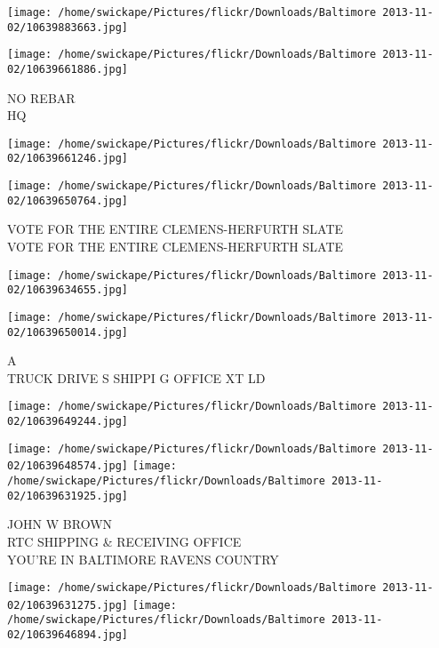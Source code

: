 \documentclass[10pt,letterpaper]{article}
\begin{document}
\texttt{[image: /home/swickape/Pictures/flickr/Downloads/Baltimore 2013-11-02/10639883663.jpg]}

\vspace{0.25in}
\texttt{[image: /home/swickape/Pictures/flickr/Downloads/Baltimore 2013-11-02/10639661886.jpg]}

NO REBAR\\
HQ\\
\pagebreak

\texttt{[image: /home/swickape/Pictures/flickr/Downloads/Baltimore 2013-11-02/10639661246.jpg]}

\vspace{0.25in}
\texttt{[image: /home/swickape/Pictures/flickr/Downloads/Baltimore 2013-11-02/10639650764.jpg]}

VOTE FOR THE ENTIRE CLEMENS{-}HERFURTH SLATE\\
VOTE FOR THE ENTIRE CLEMENS{-}HERFURTH SLATE\\
\pagebreak

\texttt{[image: /home/swickape/Pictures/flickr/Downloads/Baltimore 2013-11-02/10639634655.jpg]}

\vspace{0.25in}
\texttt{[image: /home/swickape/Pictures/flickr/Downloads/Baltimore 2013-11-02/10639650014.jpg]}

A\\
TRUCK DRIVE S SHIPPI G OFFICE XT LD\\
\pagebreak

\texttt{[image: /home/swickape/Pictures/flickr/Downloads/Baltimore 2013-11-02/10639649244.jpg]}

\vspace{0.25in}
\texttt{[image: /home/swickape/Pictures/flickr/Downloads/Baltimore 2013-11-02/10639648574.jpg]}
\texttt{[image: /home/swickape/Pictures/flickr/Downloads/Baltimore 2013-11-02/10639631925.jpg]}

JOHN W BROWN\\
RTC SHIPPING \& RECEIVING OFFICE\\
YOU'RE IN BALTIMORE RAVENS COUNTRY\\
\pagebreak

\texttt{[image: /home/swickape/Pictures/flickr/Downloads/Baltimore 2013-11-02/10639631275.jpg]}
\texttt{[image: /home/swickape/Pictures/flickr/Downloads/Baltimore 2013-11-02/10639646894.jpg]}
\end{document}
